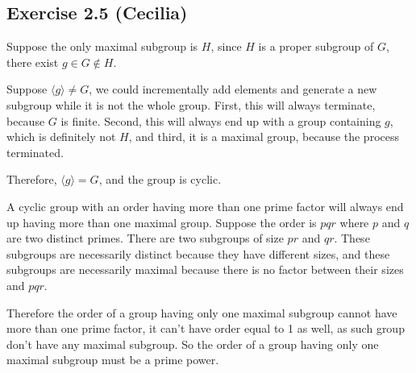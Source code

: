 \subsection*{Exercise 2.5 (Cecilia)}
Suppose the only maximal subgroup is $ H $, since $ H $ is a proper subgroup of $ G $, there exist $ g \in G \notin H $.

Suppose $ \langle g \rangle \ne G $, we could incrementally add elements and generate a new subgroup while it is not the whole group. First, this will always terminate, because $ G $ is finite. Second, this will always end up with a group containing $ g $, which is definitely not $ H $, and third, it is a maximal group, because the process terminated.

Therefore, $ \langle g \rangle = G $, and the group is cyclic.

A cyclic group with an order having more than one prime factor will always end up having more than one maximal group. Suppose the order is $ pqr $ where $ p $ and $ q $ are two distinct primes. There are two subgroups of size $ pr $ and $ qr $. These subgroups are necessarily distinct because they have different sizes, and these subgroups are necessarily maximal because there is no factor between their sizes and $ pqr $.

Therefore the order of a group having only one maximal subgroup cannot have more than one prime factor, it can't have order equal to 1 as well, as such group don't have any maximal subgroup. So the order of a group having only one maximal subgroup must be a prime power.
